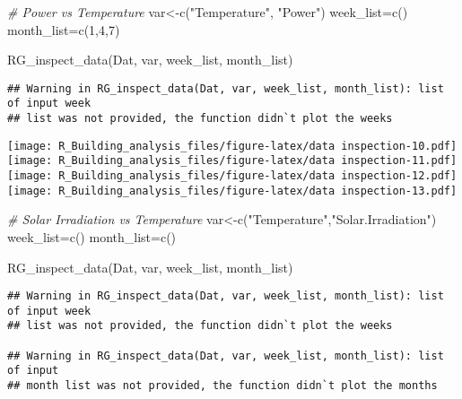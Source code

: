 \documentclass[
]{article}
\newenvironment{Shaded}{\begin{snugshade}}{\end{snugshade}}
\newcommand{\CommentTok}[1]{\textcolor[rgb]{0.56,0.35,0.01}{\textit{#1}}}
\newcommand{\DecValTok}[1]{\textcolor[rgb]{0.00,0.00,0.81}{#1}}
\newcommand{\FunctionTok}[1]{\textcolor[rgb]{0.00,0.00,0.00}{#1}}
\newcommand{\NormalTok}[1]{#1}
\newcommand{\OtherTok}[1]{\textcolor[rgb]{0.56,0.35,0.01}{#1}}
\newcommand{\StringTok}[1]{\textcolor[rgb]{0.31,0.60,0.02}{#1}}
\begin{document}
\begin{Shaded}
\begin{Highlighting}[]
  \CommentTok{\# Power vs Temperature}
\NormalTok{  var}\OtherTok{\textless{}{-}}\FunctionTok{c}\NormalTok{(}\StringTok{"Temperature"}\NormalTok{, }\StringTok{"Power"}\NormalTok{)}
\NormalTok{  week\_list}\OtherTok{=}\FunctionTok{c}\NormalTok{()}
\NormalTok{  month\_list}\OtherTok{=}\FunctionTok{c}\NormalTok{(}\DecValTok{1}\NormalTok{,}\DecValTok{4}\NormalTok{,}\DecValTok{7}\NormalTok{)}
  
  \FunctionTok{RG\_inspect\_data}\NormalTok{(Dat, var, week\_list, month\_list)}
\end{Highlighting}
\end{Shaded}

\begin{verbatim}
## Warning in RG_inspect_data(Dat, var, week_list, month_list): list of input week
## list was not provided, the function didn`t plot the weeks
\end{verbatim}

\texttt{[image: R\_Building\_analysis\_files/figure-latex/data inspection-10.pdf]}
\texttt{[image: R\_Building\_analysis\_files/figure-latex/data inspection-11.pdf]}
\texttt{[image: R\_Building\_analysis\_files/figure-latex/data inspection-12.pdf]}
\texttt{[image: R\_Building\_analysis\_files/figure-latex/data inspection-13.pdf]}

\begin{Shaded}
\begin{Highlighting}[]
  \CommentTok{\# Solar Irradiation vs Temperature}
\NormalTok{  var}\OtherTok{\textless{}{-}}\FunctionTok{c}\NormalTok{(}\StringTok{"Temperature"}\NormalTok{,}\StringTok{"Solar.Irradiation"}\NormalTok{)}
\NormalTok{  week\_list}\OtherTok{=}\FunctionTok{c}\NormalTok{()}
\NormalTok{  month\_list}\OtherTok{=}\FunctionTok{c}\NormalTok{()}
  
  \FunctionTok{RG\_inspect\_data}\NormalTok{(Dat, var, week\_list, month\_list)}
\end{Highlighting}
\end{Shaded}

\begin{verbatim}
## Warning in RG_inspect_data(Dat, var, week_list, month_list): list of input week
## list was not provided, the function didn`t plot the weeks

## Warning in RG_inspect_data(Dat, var, week_list, month_list): list of input
## month list was not provided, the function didn`t plot the months
\end{verbatim}
\end{document}
